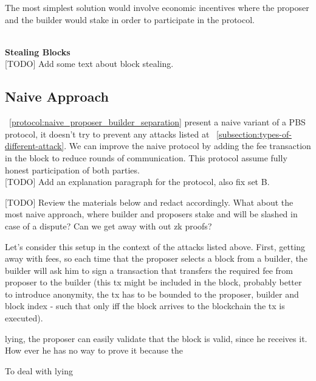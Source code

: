 \documentclass[11pt]{article}
\begin{document}
The most simplest solution would involve economic incentives where the proposer and the builder would stake in order to participate in the protocol.

\\[8pt]
\noindent\textbf{Stealing Blocks}\\[4pt]
[TODO] Add some text about block stealing.


\subsection{Naive Approach}
~\ref{protocol:naive_proposer_builder_separation} present a naive variant of a PBS protocol, it doesn't try to prevent any attacks listed at ~\ref{subsection:types-of-different-attack}. We can improve the naive protocol by adding the fee transaction in the block to reduce rounds of communication.
This protocol assume fully honest participation of both parties.
\\[16pt]


[TODO] Add an explanation paragraph for the protocol, also fix set B.

[TODO] Review the materials below and redact accordingly.
What about the most naive approach, where builder and proposers stake and will be slashed in case of a dispute? Can we get away with out zk proofs?

Let's consider this setup in the context of the attacks listed above. First, getting away with fees, so each time that the proposer selects a block from a builder, the builder will ask him to sign a transaction that transfers the required fee from proposer to the builder (this tx might be included in the block, probably better to introduce anonymity,  the tx has to be bounded to the proposer, builder and block index - such that only iff the block arrives to the blockchain the tx is executed).

lying, the proposer can easily validate that the block is valid, since he receives it. How ever he has no way to prove it because the 

To deal with lying
\end{document}
